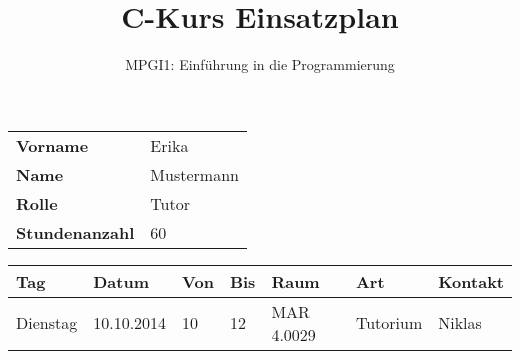 \documentclass[a4paper,smallheadings]{scrartcl}
\newcommand{\Author}{MPGI1: Einführung in die Programmierung}
\newcommand{\Title}{C-Kurs Einsatzplan}
\begin{document}
\title{\Title}
\author{\Author}
\date{}
\maketitle
\thispagestyle{empty}
\begin{table}[h!]
    \centering
    \begin{tabular}{ll}
        \textbf{Vorname} & Erika\\
        \textbf{Name} & Mustermann\\
        \textbf{Rolle} & Tutor\\
        \textbf{Stundenanzahl} & 60\\
    \end{tabular}
\end{table}
\vspace{1cm}

\begin{tabular}{lllllll}
    \textbf{Tag} & \textbf{Datum} & \textbf{Von} & \textbf{Bis} & \textbf{Raum} &
    \textbf{Art} & \textbf{Kontakt}\\\hline
    Dienstag & 10.10.2014 & 10 & 12 & MAR 4.0029 & Tutorium & Niklas\\
\end{tabular}
\end{document}
